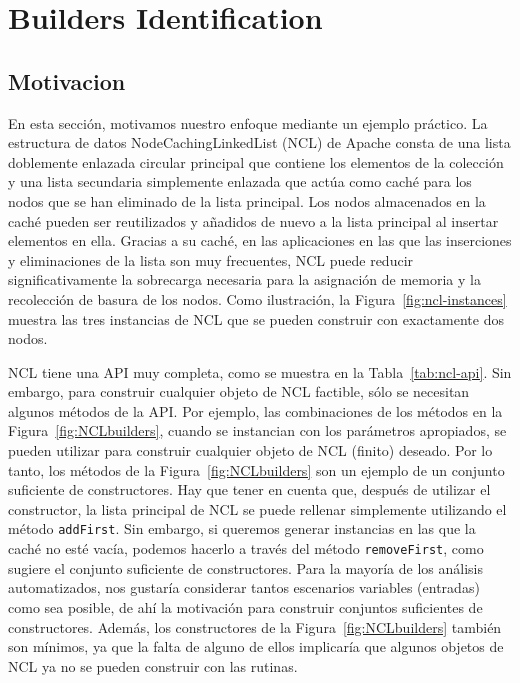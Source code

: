 \chapter[Builders Identification]{Builders Identification}
\label{cap:builders}
\section{Motivacion}

En esta sección, motivamos nuestro enfoque mediante un ejemplo práctico. La estructura de datos NodeCachingLinkedList (NCL) de Apache \cite{apache} consta de una lista doblemente enlazada circular principal que contiene los elementos de la colección y una lista secundaria simplemente enlazada que actúa como caché para los nodos que se han eliminado de la lista principal. Los nodos almacenados en la caché pueden ser reutilizados y añadidos de nuevo a la lista principal al insertar elementos en ella. Gracias a su caché, en las aplicaciones en las que las inserciones y eliminaciones de la lista son muy frecuentes, NCL puede reducir significativamente la sobrecarga necesaria para la asignación de memoria y la recolección de basura de los nodos. Como ilustración, la Figura~\ref{fig:ncl-instances} muestra las tres instancias de NCL que se pueden construir con exactamente dos nodos.

NCL tiene una API muy completa, como se muestra en la Tabla~\ref{tab:ncl-api}. Sin embargo, para construir cualquier objeto de NCL factible, sólo se necesitan algunos métodos de la API. Por ejemplo, las combinaciones de los métodos en la Figura~\ref{fig:NCLbuilders}, cuando se instancian con los parámetros apropiados, se pueden utilizar para construir cualquier objeto de NCL (finito) deseado. Por lo tanto, los métodos de la Figura~\ref{fig:NCLbuilders} son un ejemplo de un conjunto suficiente de constructores. Hay que tener en cuenta que, después de utilizar el constructor, la lista principal de NCL se puede rellenar simplemente utilizando el método \texttt{addFirst}. Sin embargo, si queremos generar instancias en las que la caché no esté vacía, podemos hacerlo a través del método \texttt{removeFirst}, como sugiere el conjunto suficiente de constructores. Para la mayoría de los análisis automatizados, nos gustaría considerar tantos escenarios variables (entradas) como sea posible, de ahí la motivación para construir conjuntos suficientes de constructores. Además, los constructores de la Figura~\ref{fig:NCLbuilders} también son mínimos, ya que la falta de alguno de ellos implicaría que algunos objetos de NCL ya no se pueden construir con las rutinas.

